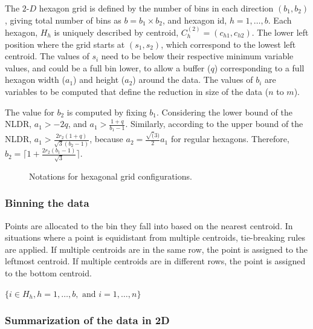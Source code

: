 \documentclass[
  12pt]{article}
\newcommand\gD{$2\text{-}D$}
\begin{document}
The \gD{} hexagon grid is defined by the number of bins in each
direction \((b_1, b_2)\), giving total number of bins as
\(b = b_1 \times b_2\), and hexagon id, \(h = 1, \dots, b\). Each
hexagon, \(H_h\) is uniquely described by centroid,
\(C_{h}^{(2)} = (c_{h1}, c_{h2})\). The lower left position where the
grid starts at \((s_1, s_2)\), which correspond to the lowest left
centroid. The values of \(s_i\) need to be below their respective
minimum variable values, and could be a full bin lower, to allow a
buffer (\(q\)) corresponding to a full hexagon width (\(a_1\)) and
height (\(a_2\)) around the data. The values of \(b_i\) are variables to
be computed that define the reduction in size of the data (\(n\) to
\(m\)).

The value for \(b_2\) is computed by fixing \(b_1\). Considering the
lower bound of the NLDR, \(a_1 > -2q\), and
\(a_1 > \frac{1+q}{b_1 -1}\). Similarly, according to the upper bound of
the NLDR, \(a_1 > \frac{2r_2(1 + q)}{\sqrt{3}(b_2 - 1)}\), because
\(a_2 = \frac{\sqrt(3)}{2}a_1\) for regular hexagons. Therefore,
\(b_2 = \Big\lceil1 +\frac{2r_2(b_1 - 1)}{\sqrt{3}}\Big\rceil\).

\begin{figure}[H]


\caption{\label{fig-hex-param}Notations for hexagonal grid
configurations.}

\end{figure}%

\subsubsection{Binning the data}\label{binning-the-data}

Points are allocated to the bin they fall into based on the nearest
centroid. In situations where a point is equidistant from multiple
centroids, tie-breaking rules are applied. If multiple centroids are in
the same row, the point is assigned to the leftmost centroid. If
multiple centroids are in different rows, the point is assigned to the
bottom centroid.

\(\{ i \in H_h, h = 1, \dots, b, \text{ and } i = 1, \dots, n\}\)

\subsubsection{Summarization of the data in
2D}\label{summarization-of-the-data-in-2d}
\end{document}
